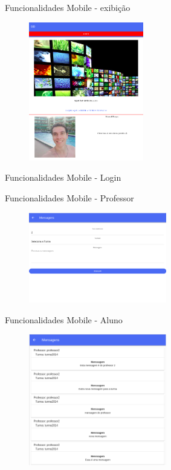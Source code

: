 \documentclass{aula-ifb}
\begin{document}
\begin{frame}{Funcionalidades Mobile - exibição}
\begin{figure}[h]
\includegraphics[width=5cm]{figuras/mobile1.png}
\label{fig:facebookgraph}
\end{figure}
\end{frame}

\begin{frame}{Funcionalidades Mobile - Login}

\end{frame}

\begin{frame}{Funcionalidades Mobile - Professor}
\begin{figure}[h]
\includegraphics[width=6cm]{figuras/mobile2.png}
\label{fig:facebookgraph}
\end{figure}
\end{frame}

\begin{frame}{Funcionalidades Mobile - Aluno}
\begin{figure}[h]
\includegraphics[width=6cm]{figuras/mobile3.png}
\label{fig:figuramobile3}
\end{figure}
\end{frame}
\end{document}
